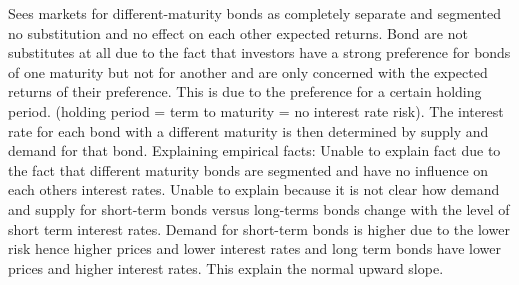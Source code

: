 \documentclass[12pt]{examnotes}
\begin{document}
\ra Sees markets for different-maturity bonds as completely separate and segmented no substitution and no effect on each other expected returns.
\ra Bond are not substitutes at all due to the fact that investors have a strong preference for bonds of one maturity but not for another and are only concerned with the expected returns of their preference. This is due to the preference for a certain holding period.  (holding period = term to maturity = no interest rate risk).
\ra The interest rate for each bond with a different maturity is then determined by supply and demand for that bond. 
\ra Explaining empirical facts:
 Unable to explain fact due to the fact that different maturity bonds are segmented and have no influence on each others interest rates.
 Unable to explain because it is not clear how demand and supply for short-term bonds versus long-terms bonds change with the level of short term interest rates. 
 Demand for short-term bonds is higher due to the lower risk hence higher prices and lower interest rates and long term bonds have lower prices and higher interest rates. This explain the normal upward slope. 
\end{document}
